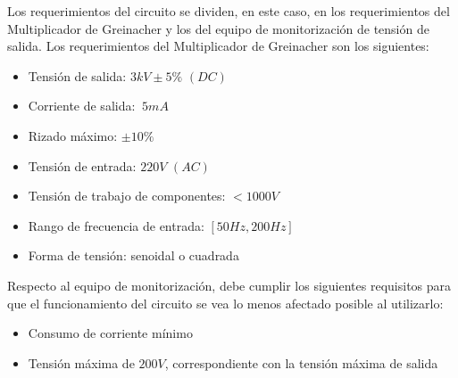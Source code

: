 Los requerimientos del circuito se dividen, en este caso, en los requerimientos del Multiplicador de Greinacher y los del equipo de monitorización
de tensión de salida. Los requerimientos del Multiplicador de Greinacher son los siguientes:

\begin{itemize}
    \item Tensión de salida: $3kV \pm 5\%\,\, \left(DC\right)$
    \item Corriente de salida: $~5mA$
    \item Rizado máximo: $\pm 10\%$
    \item Tensión de entrada: $220V\,\, \left(AC\right)$
    \item Tensión de trabajo de componentes: $<1000V$
    \item Rango de frecuencia de entrada: $\left[50Hz, 200Hz\right]$
    \item Forma de tensión: senoidal o cuadrada
\end{itemize}

Respecto al equipo de monitorización, debe cumplir los siguientes requisitos para que el funcionamiento del circuito se vea 
lo menos afectado posible al utilizarlo:

\begin{itemize}
    \item Consumo de corriente mínimo
    \item Tensión máxima de $200V$, correspondiente con la tensión máxima de salida
\end{itemize}